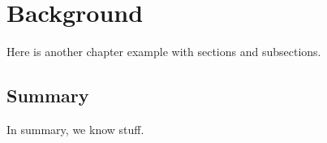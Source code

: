 \documentclass[../../main.tex]{subfiles}
\begin{document}
\chapter{Background}
\label{chap:bg}

Here is another chapter example with sections and subsections.




\section{Summary}

In summary, we know stuff.
\end{document}
